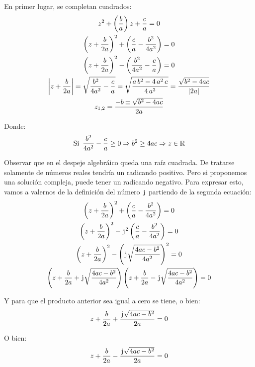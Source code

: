 En primer lugar, se completan cuadrados:
\begin{gather*}
    z^2 + \left(\frac{b}{a} \right) z + \frac{c}{a} = 0
    \\
    \left( z+\frac{b}{2a} \right)^2 + \left( \frac{c}{a}-\frac{b^2}{4a^2} \right) = 0
    \\
    \left( z+\frac{b}{2a} \right)^2 - \left( \frac{b^2}{4a^2} - \frac{c}{a} \right) = 0
    \\
    {\left| {z+\frac{b}{2a}} \right|} = \sqrt{\frac{b^2}{4a^2} - \frac{c}{a}}
    = \sqrt{\frac{a \, b^2 - 4 \, a^2 \, c}{4 \, a^3}}
    = \frac{\sqrt{b^2 - 4ac}}{{\left| {2a} \right|}}
    \\
    z_{1,2} = \frac{-b \pm \sqrt{b^2-4ac}}{2a}
\end{gather*}

Donde:
\begin{equation*}
    \textrm{Si} \enspace \frac{b^2}{4a^2} - \frac{c}{a} \geq 0 \Rightarrow b^2 \geq 4ac \Rightarrow z \in \mathbb{R}
\end{equation*}

Observar que en el despeje algebráico queda una raíz cuadrada.
De tratarse solamente de números reales tendría un radicando positivo.
Pero si proponemos una solución compleja, puede tener un radicando negativo.
Para expresar esto, vamos a valernos de la definición del número $\mkern2mu\mathrm{j}\mkern1mu$ partiendo de la segunda ecuación:
\begin{gather*}
    \left( z+\frac{b}{2a} \right)^2 + \left( \frac{c}{a} - \frac{b^2}{4a^2} \right) = 0
    \\
    \left( z+\frac{b}{2a} \right)^2 - \iu^2 \left( \frac{c}{a}-\frac{b^2}{4a^2} \right) = 0
    \\
    \left( z+\frac{b}{2a} \right)^2 - \left( \iu \sqrt{\frac{4ac-b^2}{4a^2}} \right)^2 = 0
    \\
    \scale{0.98}
    {
    \left( z+\frac{b}{2a} + \iu \sqrt{\frac{4ac-b^2}{4a^2}} \right) \left( z+\frac{b}{2a} - \iu \sqrt{\frac{4ac-b^2}{4a^2}} \right) = 0
    }
\end{gather*}

Y para que el producto anterior sea igual a cero se tiene, o bien:
\begin{equation*}
    z + \frac{b}{2a} + \frac{\mkern2mu\mathrm{j}\mkern1mu \sqrt{4ac-b^2}}{2a} = 0
\end{equation*}

O bien:
\begin{equation*}
    z + \frac{b}{2a} - \frac{\mkern2mu\mathrm{j}\mkern1mu \sqrt{4ac-b^2}}{2a} = 0
\end{equation*}

